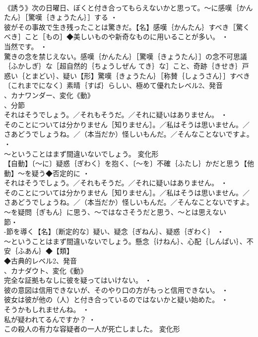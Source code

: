 \documentclass[8pt]{extreport}
\begin{document}
\begin{CJK}{UTF8}{min}
\\	《誘う》次の日曜日、ぼくと付き合ってもらえないかと思って。～に感嘆｛かんたん｝［驚嘆｛きょうたん｝］する ・
\\	彼がその事故で生き残ったことは驚きだ。【名】感嘆｛かんたん｝すべき［驚くべき］こと［もの］◆美しいものや新奇なものに用いることが多い。 ・
\\	当然です。 ・
\\	驚きの念を禁じえない。感嘆｛かんたん｝［驚嘆｛きょうたん｝］の念不可思議｛ふかしぎ｝な［超自然的｛ちょうしぜん てき｝な］こと、奇跡｛きせき｝戸惑い｛とまどい｝、疑い【形】驚嘆｛きょうたん｝［称賛｛しょうさん｝］すべき〔これまでになく〕素晴｛すば｝らしい、極めて優れたレベル2、発音
\\	、カナワンダー、変化《動》
\\	、分節
\\	それはそうでしょう。／それもそうだ。／それに疑いはありません。 ・
\\	そのことについては分かりません［知りません］。／私はそうは思いません。／さあどうでしょうね。／（本当だか）怪しいもんだ。／そんなことないですよ。 ・
\\	～ということはまず間違いないでしょう。	変化形 
\\	【自動】〔～に〕疑惑｛ぎわく｝を抱く、〔～を〕不確｛ふたし｝かだと思う【他動】～を疑う◆否定的に ・
\\	それはそうでしょう。／それもそうだ。／それに疑いはありません。 ・
\\	そのことについては分かりません［知りません］。／私はそうは思いません。／さあどうでしょうね。／（本当だか）怪しいもんだ。／そんなことないですよ。～を疑問｛ぎもん｝に思う、～ではなさそうだと思う、～とは思えない
\\	節・
\\	-節を導く【名】〔断定的な〕疑い、疑念｛ぎねん｝、疑惑｛ぎわく｝ ・
\\	～ということはまず間違いないでしょう。懸念｛けねん｝、心配｛しんぱい｝、不安｛ふあん｝◆【類】
\\	◆古典的レベル2、発音
\\	、カナダウト、変化《動》
\\	完全な証拠もなしに彼を疑ってはいけない。 ・
\\	彼の意図は信用できないが、そのやり口の方がもっと信用できない。 ・
\\	彼女は彼が他の（人）と付き合っているのではないかと疑い始めた。 ・
\\	そうかもしれませんね。 ・
\\	私が疑われてるんですか？ ・
\\	この殺人の有力な容疑者の一人が死亡しました。	変化形 

\end{CJK}
\end{document}
